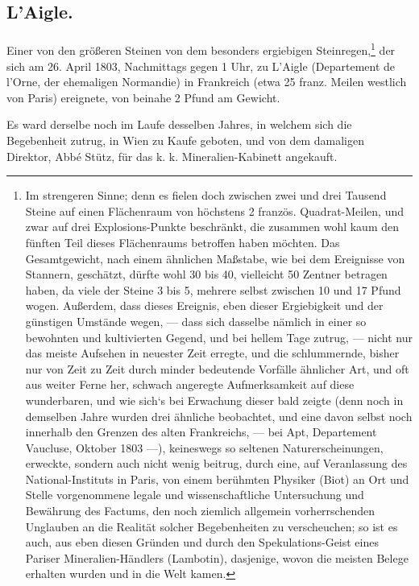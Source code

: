 \documentclass[a4paper, 11pt, oneside, german]{article}
\begin{document}
\subsection{L'Aigle.}
\paragraph{}
Einer von den größeren Steinen von dem besonders ergiebigen Steinregen,\footnote{Im strengeren Sinne; denn es fielen doch zwischen zwei und drei Tausend Steine auf einen Flächenraum von höchstens 2 französ. Quadrat-Meilen, und zwar auf drei Explosions-Punkte beschränkt, die zusammen wohl kaum den fünften Teil dieses Flächenraums betroffen haben möchten. Das Gesamtgewicht, nach einem ähnlichen Maßstabe, wie bei dem Ereignisse von Stannern, geschätzt, dürfte wohl 30 bis 40, vielleicht 50 Zentner betragen haben, da viele der Steine 3 bis 5, mehrere selbst zwischen 10 und 17 Pfund wogen. Außerdem, dass dieses Ereignis, eben dieser Ergiebigkeit und der günstigen Umstände wegen, --- dass sich dasselbe nämlich in einer so bewohnten und kultivierten Gegend, und bei hellem Tage zutrug, --- nicht nur das meiste Aufsehen in neuester Zeit erregte, und die schlummernde, bisher nur von Zeit zu Zeit durch minder bedeutende Vorfälle ähnlicher Art, und oft aus weiter Ferne her, schwach angeregte Aufmerksamkeit auf diese wunderbaren, und wie sich‘s bei Erwachung dieser bald zeigte (denn noch in demselben Jahre wurden drei ähnliche beobachtet, und eine davon selbst noch innerhalb den Grenzen des alten Frankreichs, --- bei Apt, Departement Vaucluse, Oktober 1803 ---), keineswegs so seltenen Naturerscheinungen, erweckte, sondern auch nicht wenig beitrug, durch eine, auf Veranlassung des National-Instituts in Paris, von einem berühmten Physiker (Biot) an Ort und Stelle vorgenommene legale und wissenschaftliche Untersuchung und Bewährung des Factums, den noch ziemlich allgemein vorherrschenden Unglauben an die Realität solcher Begebenheiten zu verscheuchen; so ist es auch, aus eben diesen Gründen und durch den Spekulations-Geist eines Pariser Mineralien-Händlers (Lambotin), dasjenige, wovon die meisten Belege erhalten wurden und in die Welt kamen.} der sich am 26. April 1803, Nachmittags gegen 1 Uhr, zu L'Aigle (Departement de l'Orne, der ehemaligen Normandie) in Frankreich (etwa 25 franz. Meilen westlich von Paris) ereignete, von beinahe 2 Pfund am Gewicht.

Es ward derselbe noch im Laufe desselben Jahres, in welchem sich die Begebenheit zutrug, in Wien zu Kaufe geboten, und von dem damaligen Direktor, Abbé Stütz, für das k. k. Mineralien-Kabinett angekauft.
\end{document}
